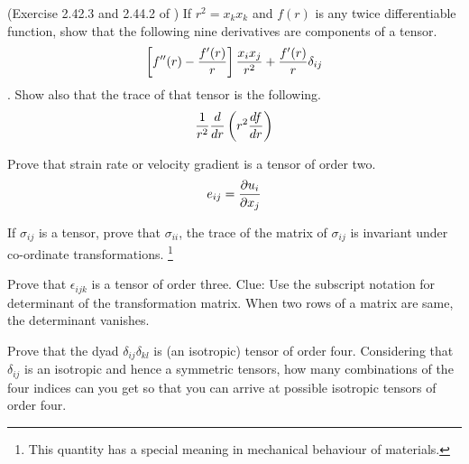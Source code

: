 
\begin{question}
(Exercise 2.42.3 and 2.44.2 of \cite{aris}) If $r^2 = x_k x_k$ and $f(r)$ is any twice differentiable function, show that the following nine derivatives are components of a tensor.
$$\left[ f''(r) -{f'(r) \over r} \right] {x_i x_j \over r^2} + {f'(r) \over r} \delta_{ij} $$.
Show also that the trace of that tensor is the following.
$${1 \over r^2}{d \over dr} \left( r^2 {df \over dr} \right)$$
\end{question}
\begin{solution}[print]
\end{solution}


\begin{question}
Prove that strain rate or velocity gradient is a tensor of order two.
$$ e_{ij} = {\partial u_i \over \partial x_j}$$
\end{question}
\begin{solution}[print]
\end{solution}


\begin{question}
If $\sigma_{ij}$ is a tensor, prove that $\sigma_{ii}$, the trace of the matrix of $\sigma_{ij}$ is invariant under co-ordinate transformations. \footnote{This quantity has a special meaning in mechanical behaviour of materials.}
\end{question}
\begin{solution}[print]
\end{solution}


\begin{question}
Prove that $\epsilon_{ijk}$ is a tensor of order three. Clue: Use the subscript notation for determinant of the transformation matrix. When two rows of a matrix are same, the determinant vanishes.
\end{question}
\begin{solution}[print]
\end{solution}


\begin{question}
Prove that the dyad $\delta_{ij}\delta_{kl}$ is (an isotropic) tensor of order four. Considering that $\delta_{ij}$ is an isotropic and hence a symmetric tensors, how many combinations of the four indices can you get so that you can arrive at possible isotropic tensors of order four.
\end{question}
\begin{solution}[print]
\end{solution}


